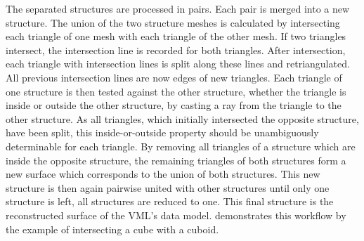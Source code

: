 The separated structures are processed in pairs.
Each pair is merged into a new structure.
The union of the two structure meshes is calculated by intersecting each triangle of one mesh with each triangle of the other mesh.
If two triangles intersect, the intersection line is recorded for both triangles.
After intersection, each triangle with intersection lines is split along these lines and retriangulated.
All previous intersection lines are now edges of new triangles.
Each triangle of one structure is then tested against the other structure, whether the triangle is inside or outside the other structure, \eg by casting a ray from the triangle to the other structure.
As all triangles, which initially intersected the opposite structure, have been split, this inside-or-outside property should be unambiguously determinable for each triangle.
By removing all triangles of a structure which are inside the opposite structure, the remaining triangles of both structures form a new surface which corresponds to the union of both structures.
This new structure is then again pairwise united with other structures until only one structure is left, \ie all structures are reduced to one.
This final structure is the reconstructed surface of the VML's data model.
 demonstrates this workflow by the example of intersecting a cube with a cuboid.

